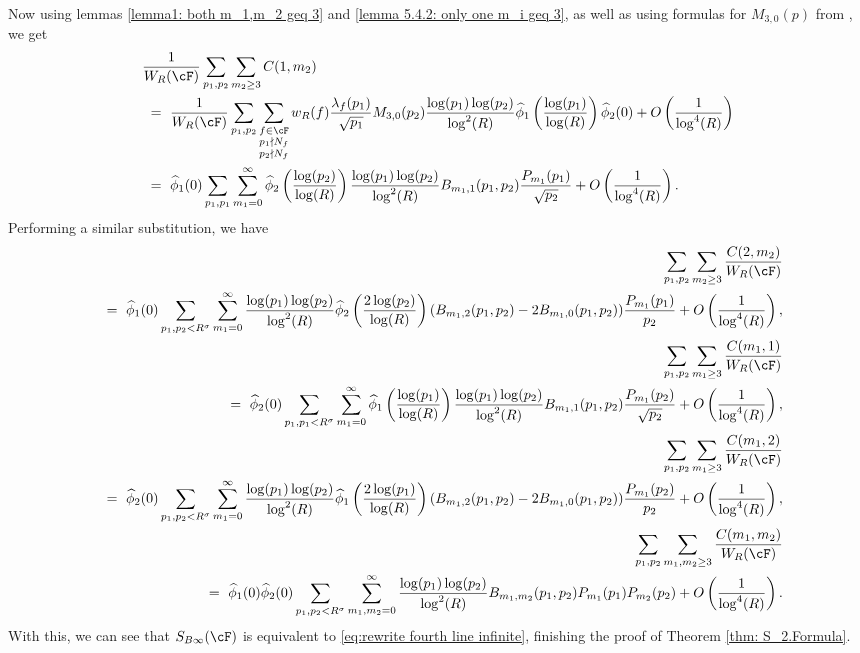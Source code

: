 \documentclass[11pt, reqno]{amsart}
\theoremstyle{definition}
\theoremstyle{remark}
\numberwithin{equation}{section}
\renewcommand{\hat}{\widehat}
\begin{document}
Now using lemmas \ref{lemma1: both m_1,m_2 geq 3} and \ref{lemma 5.4.2: only one m_i geq 3}, as well as using formulas for $M_{3,0}(p)$ from \cite{Miller2009_LOTerms_1LevelDensity}, we get \begin{align*}
&\frac{1}{W_R(\cF)}\sum_{p_1,p_2}\sum_{m_2\geq 3} C(1,m_2) \notag \\
&\ = \  \frac{1}{W_R(\cF)} \sum_{p_1,p_2} \sum_{\substack{f\in \cF\\p_1\nmid N_f\\p_2\nmid N_f }}w_R(f) \frac{\lambda_f(p_1)}{\sqrt{p_1}}M_{3,0}(p_2)\frac{\log(p_1)\log(p_2)}{\log^2(R)} \hat\phi_1\left(\frac{\log(p_1)}{\log(R)}\right)\hat\phi_2(0) + O\left(\frac{1}{\log^4(R)}\right) \\
&\ = \  \hat{\phi}_1(0)\sum_{p_1,p_1}\sum_{m_1=0}^{\infty}\hat{\phi}_2\left(\frac{\log(p_2)}{\log(R)} \right)\frac{\log(p_1) \log(p_2)}{\log^2(R)}B_{m_1,1}(p_1,p_2)\frac{P_{m_1}(p_1)}{\sqrt{p_2}} + O\left(\frac{1}{\log^4(R)}\right).
\end{align*}\normalsize
Performing a similar substitution, we have 
\footnotesize\begin{eqnarray}
& &\sum_{p_1,p_2}\sum_{m_2\geq 3} \frac{C(2,m_2)}{W_R(\cF)}\nonumber\\  & &= \  \hat{\phi}_1(0)\sum_{p_1,p_2<R^\sigma}\sum_{m_1=0}^{\infty}\frac{\log(p_1) \log(p_2)}{\log^2(R)}\hat{\phi}_2\left( \frac{2\log(p_2)}{\log(R)}\right)(B_{m_1,2}(p_1,p_2)-2B_{m_1,0}(p_1,p_2))\frac{P_{m_1}(p_1)}{p_2}
+ O\left(\frac{1}{\log^4(R)}\right), \notag
\\
& &\sum_{p_1,p_2}\sum_{m_1\geq 3} \frac{C(m_1,1)}{W_R(\cF)}\nonumber\\  &  &=  \  \hat{\phi}_2(0)\sum_{p_1,p_1<R^\sigma}\sum_{m_1=0}^{\infty}\hat{\phi}_1\left(\frac{\log(p_1)}{\log(R)} \right)\frac{\log(p_1) \log(p_2)}{\log^2(R)}B_{m_1,1}(p_1,p_2)\frac{P_{m_1}(p_2)}{\sqrt{p_2}}+ O\left(\frac{1}{\log^4(R)}\right),\nonumber\\
& &\sum_{p_1,p_2}\sum_{m_1\geq 3} \frac{C(m_1,2)}{W_R(\cF)} \nonumber\\ & & =\   \hat{\phi}_2(0)\sum_{p_1,p_2<R^\sigma}\sum_{m_1=0}^{\infty}\frac{\log(p_1) \log(p_2)}{\log^2(R)}\hat{\phi}_1\left( \frac{2\log(p_1)}{\log(R)}\right)(B_{m_1,2}(p_1,p_2)-2B_{m_1,0}(p_1,p_2))\frac{P_{m_1}(p_2)}{p_2}
+ O\left(\frac{1}{\log^4(R)}\right),\nonumber\\
& &\sum_{p_1,p_2}\sum_{m_1,m_2\geq 3} \frac{C(m_1,m_2)}{W_R(\cF)} \nonumber\\
& & = \  \hat{\phi}_1(0)\hat{\phi}_2(0)\sum_{p_1,p_2<R^\sigma}\sum_{m_1,m_2=0}^\infty\frac{\log(p_1) \log(p_2)}{\log^2(R)}B_{m_1,m_2}(p_1,p_2)P_{m_1}(p_1)P_{m_2}(p_2) + O\left(\frac{1}{\log^4(R)}\right).
\end{eqnarray}\normalsize
With this, we can see that $S_{B\infty}(\cF)$ is equivalent to \eqref{eq:rewrite fourth line infinite}, finishing the proof of Theorem \ref{thm: S_2.Formula}.
\end{document}
